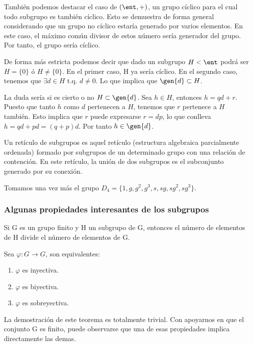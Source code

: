 \documentclass[nochap]{apuntes}
\begin{document}
   También podemos destacar el caso de $(\ent, +)$, un grupo cíclico para el cual todo subgrupo es también cíclico. Esto se demuestra
   de forma general considerando que un grupo no cíclico estaría generado por varios elementos. En este caso, el máximo común
   divisor de estos número sería generador del grupo. Por tanto, el grupo sería cíclico.
 
   De forma más estricta podemos decir que dado un subgrupo $H<\ent$ podrá ser $H=\{0\}$ ó $H\neq\{0\}$. 
   En el primer caso, H ya sería cíclico. En el segundo caso, tenemos que $\exists  d \in  H$ t.q. $d\neq 0$. Lo que implica
   que $\gen{d} \subset H$. 
   
   La duda sería si es cierto o no $H\subset \gen{d}$. Sea $h \in H$, entonces $h=qd+r$. Puesto que tanto $h$ como $d$ pertenecen a $H$,
   tenemos que $r$ pertenece a $H$ también. Esto implica que $r$ puede expresarse $r=dp$, lo que conlleva $h=qd+pd=(q+p)d$. Por tanto $h \in \gen{d}$.
 
  \begin{defn}
   Un retículo de subgrupos es aquel retículo (estructura algebraica parcialmente ordenada) formado por subgrupos de un determinado grupo
   con una relación de contención. En este retículo, la unión de dos subgrupos es el subconjunto generado por su conexión.
  \end{defn}

  \begin{example}
   Tomamos una vez más el grupo $D_{4}=\{1,g,g^{2}, g^{3}, s, sg, sg^{2}, sg^{3}\}$.\\
   
   
  \end{example}
  
\subsubsection{Algunas propiedades interesantes de los subgrupos}
 \begin{theorem}
   Si G es un grupo finito y H un subgrupo de G, entonces el número de elementos de H divide el número de elementos de G.
  \end{theorem}
  
  \begin{lemma}
   Sea $\varphi: G\rightarrow G$, son equivalentes:
   \begin{enumerate}
    \item $\varphi$  es inyectiva.
    \item $\varphi$  es biyectiva.
    \item $\varphi$  es sobreyectiva.
   \end{enumerate}
  \end{lemma}
  La demostración de este teorema es totalmente trivial. Con apoyarnos en que el conjunto G es finito, puede observarse que una de
  esas propiedades implica directamente las demas.
  
\end{document}
